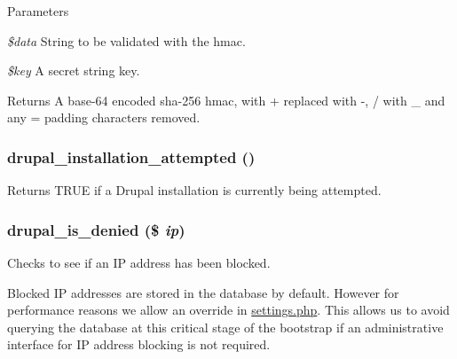\begin{DoxyParams}{Parameters}
\item[{\em \$data}]String to be validated with the hmac. \item[{\em \$key}]A secret string key.\end{DoxyParams}
\begin{DoxyReturn}{Returns}
A base-\/64 encoded sha-\/256 hmac, with + replaced with -\/, / with \_\- and any = padding characters removed. 
\end{DoxyReturn}
\hypertarget{bootstrap_8inc_ac9902394c447118612c3a71191151f2c}{
\subsubsection[{drupal\_\-installation\_\-attempted}]{\setlength{\rightskip}{0pt plus 5cm}drupal\_\-installation\_\-attempted ()}}
\label{bootstrap_8inc_ac9902394c447118612c3a71191151f2c}
Returns TRUE if a Drupal installation is currently being attempted. \hypertarget{bootstrap_8inc_ad5f73157a9aa67bd49759636f00fee8a}{
\subsubsection[{drupal\_\-is\_\-denied}]{\setlength{\rightskip}{0pt plus 5cm}drupal\_\-is\_\-denied (\$ {\em ip})}}
\label{bootstrap_8inc_ad5f73157a9aa67bd49759636f00fee8a}
Checks to see if an IP address has been blocked.

Blocked IP addresses are stored in the database by default. However for performance reasons we allow an override in \hyperlink{settings_8php}{settings.php}. This allows us to avoid querying the database at this critical stage of the bootstrap if an administrative interface for IP address blocking is not required.


